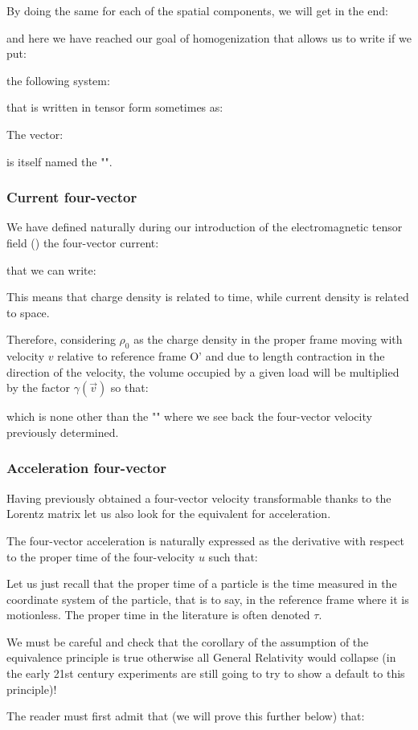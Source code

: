 	By doing the same for each of the spatial components, we will get in the end:
	
	and here we have reached our goal of homogenization that allows us to write if we put:
	
	the following system:
	
	that is written in tensor form  sometimes as:
	
	The vector:
	
	is itself named the "".
	
	\subsubsection{Current four-vector}\label{four-vector current}
	We have defined naturally during our introduction of the electromagnetic tensor field () the four-vector current:
	
	that we can write:
	
	This means that charge density is related to time, while current density is related to space.
	
	Therefore, considering $\rho_0$ as the charge density in the proper frame moving with velocity $v$ relative to reference frame O' and due to length contraction in the direction of the velocity, the volume occupied by a given load will be multiplied by the factor $\gamma(\vec{v})$ so that:
	
	which is none other than the "" where we see back the four-vector velocity previously determined.
	
	\subsubsection{Acceleration four-vector}
	Having previously obtained a four-vector velocity transformable thanks to the Lorentz matrix let us also look for the equivalent for acceleration.

	The four-vector acceleration is naturally expressed as the derivative with respect to the proper time of the four-velocity $u$ such that:
	
	Let us just recall that the proper time of a particle is the time measured in the coordinate system of the particle, that is to say, in the reference frame where it is motionless. The proper time in the literature is often denoted $\tau$.
	\begin{tcolorbox}[title=Remark,colframe=black,arc=10pt]
	We must be careful and check that the corollary of the assumption of the equivalence principle is true otherwise all General Relativity would collapse (in the early 21st century experiments are still going to try to show a default to this principle)!
	\end{tcolorbox}	
	The reader must first admit that (we will prove this further below) that:
	
